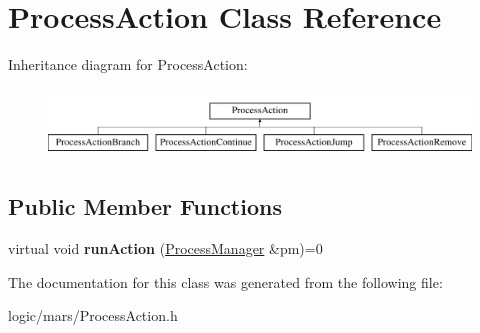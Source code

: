 \hypertarget{classProcessAction}{}\section{Process\+Action Class Reference}
\label{classProcessAction}
Inheritance diagram for Process\+Action\+:\begin{figure}[H]
\begin{center}
\leavevmode
\includegraphics[height=1.842105cm]{classProcessAction}
\end{center}
\end{figure}
\subsection*{Public Member Functions}
\begin{DoxyCompactItemize}
\item 
\mbox{\label{classProcessAction_a74bf3c774520f3c6deb1e0fc09278415}} 
virtual void {\bfseries run\+Action} (\hyperlink{classProcessManager}{Process\+Manager} \&pm)=0
\end{DoxyCompactItemize}


The documentation for this class was generated from the following file\+:\begin{DoxyCompactItemize}
\item 
logic/mars/Process\+Action.\+h\end{DoxyCompactItemize}
